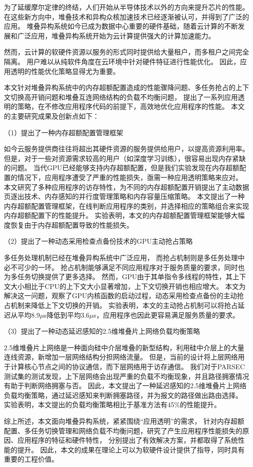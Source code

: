 \begin{cabstract}
为了延缓摩尔定律的终结，人们开始从半导体技术以外的方向来提升芯片的性能。
在这些新方向中，堆叠技术和异构众核加速技术已经逐渐被认可，并得到了广泛的应用。
堆叠异构系统如今已成为数据中心重要的硬件基础，随着云计算的不断发展和广泛应用，堆叠异构系统开始为云计算提供强大的计算加速能力。

然而，云计算的软硬件资源以服务的形式同时提供给大量租户，而多租户之间完全隔离。
用户难以从纯软件角度在云环境中针对硬件特征进行性能优化。
因此，应用透明的性能优化策略显得尤为重要。

本文针对堆叠异构系统中的内存超额配置造成的性能骤降问题、多任务抢占的上下文切换高开销问题和堆叠互连网络结构的负载不均衡问题，
提出了一系列应用透明的策略，在不修改应用程序代码的前提下，高效地优化应用程序的性能。
本文的主要研究成果及创新点如下：

（1）提出了一种内存超额配置管理框架

如今云服务提供商往往将超出其硬件资源的服务提供给用户，以提高资源利用率。
但是，对于一些对资源需求较高的用户（如深度学习训练），很容易出现内存紧缺的问题。
当代GPU已经能够支持内存超额配置，但是我们实验发现在内存超额配置的情况下，应用程序遭受了严重的性能损失，亟需一种应用透明策略来应对。
本文研究了多种应用程序的访存特性，为不同的内存超额配置开销提出了主动数据页逐出技术、内存感知的并行度管理策略和内存容量压缩策略。
本文提出了一种内存超额配置管理框架，在线判断应用程序的类别，并选择相应的策略组合来实现内存超额配置下的性能提升。
实验表明，本文的内存超额配置管理框架能够大幅度恢复由于内存超额配置导致的性能损失。

（2）提出了一种动态采用检查点备份技术的GPU主动抢占策略

多任务处理机制已经在堆叠异构系统中广泛应用，
而抢占机制则是多任务处理中必不可少的一环。
抢占机制能够满足不同应用程序对于服务质量的要求，同时也为多任务切换提供了更多选择。
然而，GPU由于其单指令多线程的特性，其上下文大小相比于CPU的上下文大小显著增加，上下文切换开销也相应增大。
本文为解决这一问题，观察了GPU内核函数的启动过程，动态采用检查点备份的主动抢占机制来降低上下文切换的开销。
实验表明，本文的主动抢占机制可以将抢占延迟从平均8.9$\mu$s降低到平均3.6$\mu$s，应用程序也因此更容易满足服务质量的要求。

（3）提出了一种动态延迟感知的2.5维堆叠片上网络负载均衡策略

2.5维堆叠片上网络是一种面向硅中介层堆叠的新型结构，利用硅中介层上的大量连线资源，新增加一层网络结构分担网络流量。
但是，当前的设计将上层网络用于计算核心节点之间的协议通信，而下层网络用于访存通信。
我们对于PARSEC测试集的测试发现，上下层网络会出现严重的负载不均衡现象，并且路径拥塞情况有助于判断网络拥塞与否。
因此，本文提出了一种延迟感知的2.5维堆叠片上网络负载均衡策略，通过延迟感知来判断拥塞路径，并为报文的路径做出路由选择。
实验表明，本文提出的负载均衡策略相比于基准方法有45\%的性能提升。

综上所述，本文面向堆叠异构系统，紧紧围绕``应用透明''的需求，
针对内存超额配置、多任务切换管理和网络负载不均衡问题，研究了产生应用程序性能损失的原因、应用程序的特征和硬件特性，
分别提出了有效解决方案，并都取得了系统性能的提升。
因此，本文的成果在理论上可以为软硬件设计提供了指导，同时具有重要的工程价值。

\end{cabstract}
